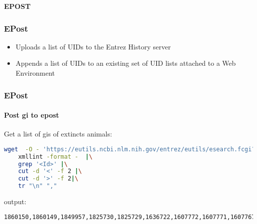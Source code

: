 \documentclass{beamer}
\newcommand{\centeredtitle}[1]{
\begin{center}
    \Huge{\bf{#1}}
\end{center}
}
\newcommand{\hugeslide}[1]{
\begin{frame}
\centeredtitle{#1}
\end{frame}
}
\begin{document}
\hugeslide{EPOST}

\begin{frame}[fragile]
\frametitle{EPost}
\begin{itemize}
\item Uploads a list of UIDs to the Entrez History server
\item Appends a list of UIDs to an existing set of UID lists attached to a Web Environment
\end{itemize}
\end{frame}


\begin{frame}[fragile]
\frametitle{EPost}
\framesubtitle{Post gi to epost}
Get a list of gis of extincts animals:
\begin{lstlisting}[language=bash,basicstyle=\tiny,breaklines=true,escapechar=\!]
 wget  -O - 'https://eutils.ncbi.nlm.nih.gov/entrez/eutils/esearch.fcgi?db=taxonomy&term=extinct[PROP]&retmax=1000' |\
 	xmllint -format -  |\
 	grep '<Id>' |\
 	cut -d '<' -f 2 |\
 	cut -d '>' -f 2|\
 	tr "\n" ","
\end{lstlisting}
output:
\begin{lstlisting}[language=bash,basicstyle=\tiny,breaklines=true,escapechar=\!]
1860150,1860149,1849957,1825730,1825729,1636722,1607772,1607771,1607767,1607757,1607756,1597978,1582057,1566623,1563127,1563126,1563125,1563124,1563123,1563122,1563121,1563120,1560315,1560314,1543223,1542494,1542469,1530197,1524889,1523245,1513476,1513474,1503129,1453604,1425170,1415635,1295174,1225531,1225530,1211276,1211275,1027716,948961,943952,867394,867393,748142,748141,741158,703576,703571,703559,693865,686441,665113,659069,656807,647691,647690,643746,643745,643744,643742,577682,572106,572105,572104,572099,572098,570943,570942,570941,551196,544298,523825,523824,523822,523821,523820,518692,518691,518689,475185,436495,436494,436493,436488,402889,399386,399178,386524,379504,363580,363579,363578,363571,339614,339612,339609,330944,330640,330639,330638,330637,330636,328612,314500,307641,304335,272462,268291,251263,251094,251093,239970,239969,237965,230980,230979,227166,227165,223567,222863,222862,216182,216181,201717,201716,192211,188536,187135,187134,187133,187132,187131,187118,184920,180214,180178,180177,180176,180175,180174,173935,166505,148923,147494,147466,147464,136416,136415,126594,126429,115942,107030,103864,94623,92649,92648,89252,89250,63631,63221,54568,54500,54497,54366,54365,48784,46906,39097,39053,39051,37349,37348,37185,27445,27444,20678,13266,13140,9619,9275,9274,9273,8818,8817,8815,8813,8812,8811,8810,8367,3409
\end{lstlisting}
\end{frame}
\end{document}
